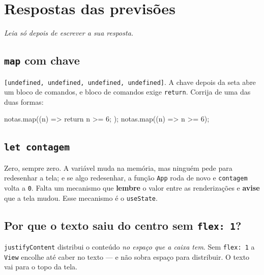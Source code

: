 \documentclass[11pt,a4paper]{article}
\newcommand{\cod}[1]{\texttt{#1}}
\begin{document}
\clearpage
\section*{Respostas das previsões}\label{apx:respostas}
\textit{Leia só depois de escrever a sua resposta.}

\subsection*{\texttt{map} com chave}
\cod{[undefined, undefined, undefined, undefined]}. A chave depois da seta abre um
bloco de comandos, e bloco de comandos exige \cod{return}. Corrija de uma das duas formas:
\begin{codigo}
notas.map((n) => { return n >= 6; });
notas.map((n) => n >= 6);
\end{codigo}

\subsection*{\texttt{let contagem}}
Zero, sempre zero. A variável muda na memória, mas ninguém pede para redesenhar
a tela; e se algo redesenhar, a função \cod{App} roda de novo e \cod{contagem} volta a \cod{0}.
Falta um mecanismo que \textbf{lembre} o valor entre as renderizações e \textbf{avise} que a
tela mudou. Esse mecanismo é o \cod{useState}.

\subsection*{Por que o texto saiu do centro sem \texttt{flex: 1}?}
\cod{justifyContent} distribui o conteúdo \emph{no espaço que a caixa tem}. Sem \cod{flex: 1}
a \cod{View} encolhe até caber no texto --- e não sobra espaço para distribuir. O texto vai
para o topo da tela.
\end{document}
